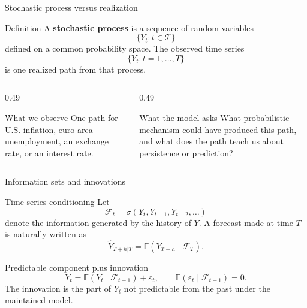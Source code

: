 \documentclass[10pt]{beamer}
\newcommand{\E}{\mathbb{E}}
\newcommand{\eps}{\varepsilon}
\newcommand{\calF}{\mathcal{F}}
\begin{document}
\begin{frame}{Stochastic process versus realization}
\label{slide:process_realization}
\small
\begin{block}{Definition}
A \textbf{stochastic process} is a sequence of random variables
\[
\{Y_t:t\in\mathcal{T}\}
\]
defined on a common probability space. The observed time series
\[
\{Y_t:t=1,\ldots,T\}
\]
is one realized path from that process.
\end{block}

\pause
\begin{columns}[T]
\begin{column}{0.49\textwidth}
\begin{exampleblock}{What we observe}
One path for U.S. inflation, euro-area unemployment, an exchange rate, or an interest rate.
\end{exampleblock}
\end{column}
\begin{column}{0.49\textwidth}
\begin{exampleblock}{What the model asks}
What probabilistic mechanism could have produced this path, and what does the path teach us about persistence or prediction?
\end{exampleblock}
\end{column}
\end{columns}
\end{frame}

\begin{frame}{Information sets and innovations}
\small
\begin{block}{Time-series conditioning}
Let
\[
\calF_t=\sigma(Y_t,Y_{t-1},Y_{t-2},\ldots)
\]
denote the information generated by the history of $Y$. A forecast made at time $T$ is naturally written as
\[
\widehat{Y}_{T+h|T}=\E(Y_{T+h}\mid \calF_T).
\]
\end{block}

\pause
\begin{exampleblock}{Predictable component plus innovation}
\[
Y_t=\E(Y_t\mid\calF_{t-1})+\eps_t,
\qquad
\E(\eps_t\mid\calF_{t-1})=0.
\]
The innovation is the part of $Y_t$ not predictable from the past under the maintained model.
\end{exampleblock}
\end{frame}
\end{document}

